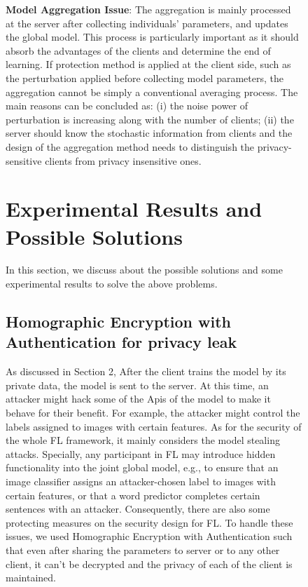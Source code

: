 \documentclass[conference]{IEEEtran}
\begin{document}
\begin{figure}

\textbf{Model Aggregation Issue}: The aggregation is mainly processed at the server after
collecting individuals’ parameters, and updates the global model. This process is particularly important as it should absorb the advantages of the clients and determine the end of learning. If protection method is applied at the client side, such as the perturbation applied before collecting model parameters, the aggregation cannot be simply a conventional averaging
process. The main reasons can be concluded as: (i) the noise power of perturbation is increasing along with the number of clients; (ii) the server should know the stochastic information from clients and the design of the aggregation method needs to distinguish the privacy-sensitive clients from privacy insensitive ones.

\vspace{\baselineskip}


\section{Experimental Results and Possible Solutions}
In this section, we discuss about the possible solutions and some experimental results to solve the above problems.

\subsection{Homographic Encryption with Authentication for privacy leak }
As discussed in Section 2, After the client trains the model by its private data, the model is sent to the server. At this time, an attacker might hack some of the Apis of the model to make it behave for their benefit. For example, the attacker might control the labels assigned to images with certain features. As for the security of the whole FL framework, it mainly considers the model stealing attacks. Specially, any participant in FL may introduce hidden functionality into the joint global model, e.g., to ensure that an image classifier assigns an attacker-chosen label to images with certain features, or that a word predictor completes certain sentences with an attacker. Consequently, there are also some protecting measures on the security design for FL.
To handle these issues, we used Homographic Encryption with Authentication such that even after sharing the parameters to server or to any other client, it can't be decrypted and the privacy of each of the client is maintained.


\end{figure}
\end{document}
